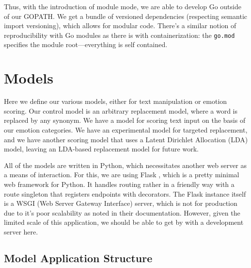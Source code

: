 \documentclass[11pt, twoside, reqno]{book}
\begin{document}
\noindent Thus, with the introduction of module mode, we are able to develop Go outside of our GOPATH. We get a bundle of versioned dependencies (respecting semantic import versioning), which allows for modular code. There's a similar notion of reproducibility with Go modules as there is with containerization: the \texttt{go.mod} specifies the module root—everything is self contained.







\chapter{Models}

Here we define our various models, either for text manipulation or emotion scoring. Our control model is an arbitrary replacement model, where a word is replaced by any synonym. We have a model for scoring text input on the basis of our emotion categories. We have an experimental model for targeted replacement, and we have another scoring model that uses a Latent Dirichlet Allocation (LDA) model, leaving an LDA-based replacement model for future work.

All of the models are written in Python, which necessitates another web server as a means of interaction. For this, we are using Flask \cite{Welcomet33:online}, which is a pretty minimal web framework for Python. It handles routing rather in a friendly way with a route singleton that registers endpoints with decorators. The Flask instance itself is a WSGI (Web Server Gateway Interface) server, which is not for production due to it's poor scalability as noted in their documentation. However, given the limited scale of this application, we should be able to get by with a development server here.
\begin{quote}
\end{quote}

\section{Model Application Structure}
\end{document}
